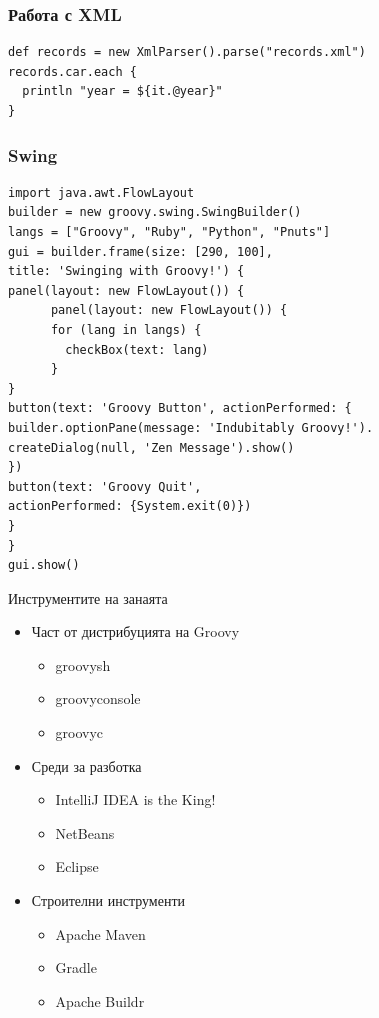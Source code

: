 \documentclass[compress,red]{beamer}
\begin{document}
\begin{frame}[fragile]
  \frametitle{Работа с XML}
  \transdissolve
\begin{lstlisting}
def records = new XmlParser().parse("records.xml")
records.car.each {
  println "year = ${it.@year}"
}
\end{lstlisting}
\end{frame}

\begin{frame}[fragile]
  \frametitle{Swing}
  \transdissolve
\begin{lstlisting}[basicstyle=\tiny]
import java.awt.FlowLayout
builder = new groovy.swing.SwingBuilder()
langs = ["Groovy", "Ruby", "Python", "Pnuts"]
gui = builder.frame(size: [290, 100],
title: 'Swinging with Groovy!') {
panel(layout: new FlowLayout()) {
      panel(layout: new FlowLayout()) {
      for (lang in langs) {
        checkBox(text: lang)
      }
}
button(text: 'Groovy Button', actionPerformed: {
builder.optionPane(message: 'Indubitably Groovy!').
createDialog(null, 'Zen Message').show()
})
button(text: 'Groovy Quit',
actionPerformed: {System.exit(0)})
}
}
gui.show()
\end{lstlisting}
\end{frame}

\begin{frame}{Инструментите на занаята}
  \transdissolve
  \begin{itemize}
    \item Част от дистрибуцията на Groovy
  \begin{itemize}
  \item groovysh
  \item groovyconsole
  \item groovyc
  \end{itemize}
    \item Среди за разботка
      \begin{itemize}
      \item IntelliJ IDEA is the King!
      \item NetBeans
      \item Eclipse
      \end{itemize}
  \item Строителни инструменти
    \begin{itemize}
      \item Apache Maven
      \item Gradle
      \item Apache Buildr
    \end{itemize}
  \end{itemize}
\end{frame}
\end{document}

